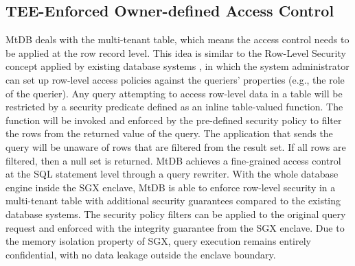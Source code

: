 \documentclass[conference]{IEEEtran}
\newcommand{\seokki}[1]{ {\color{orange}{#1}}}
\newcommand{\ours}{\xspace MtDB\xspace}
\begin{document}
\subsection{TEE-Enforced Owner-defined Access Control}\label{subsec: AC enforcement detail}
\ours deals with the multi-tenant table, which means the access control needs to be applied at the row record level. This idea is similar to the Row-Level Security concept applied by existing database systems \cite{MicrosoftRowLevelSecurity, PostgreSQLRowSecurity}, in which the system administrator can set up row-level access policies against the queriers' properties (e.g., the role of the querier). Any query attempting to access row-level data in a table will be restricted by a security predicate defined as an inline table-valued function. 
The function will be invoked and enforced by the pre-defined security policy to filter the rows from the returned value of the query. 
The application that sends the query will be unaware of rows that are filtered from the result set. If all rows are filtered, then a null set is returned. 
\ours achieves a fine-grained access control at the SQL statement level through a query rewriter.
With the whole database engine inside the SGX enclave, \ours is able to enforce row-level security in a multi-tenant table with additional security guarantees compared to the existing database systems. 
The security policy filters can be applied to the original query request and enforced with the integrity guarantee from the SGX enclave. 
Due to the memory isolation property of SGX, query execution remains entirely confidential, with no data leakage outside the enclave boundary.
\end{document}
